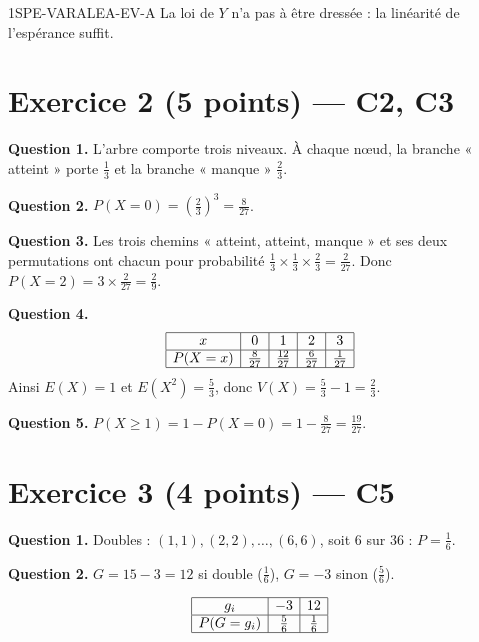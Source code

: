 \begin{corrige}{1SPE-VARALEA-EV-A}
La loi de $Y$ n'a pas à être dressée : la linéarité de l'espérance suffit.

\section*{Exercice 2 \hfill (5 points) — C2, C3}


\textbf{Question 1.} L'arbre comporte trois niveaux. À chaque nœud, la branche « atteint » porte $\frac13$ et la branche « manque » $\frac23$.

\medskip
\textbf{Question 2.} $P(X=0)=\left(\frac23\right)^3=\frac8{27}$.

\medskip
\textbf{Question 3.} Les trois chemins « atteint, atteint, manque » et ses deux permutations ont chacun pour probabilité $\frac13\times\frac13\times\frac23=\frac2{27}$. Donc $P(X=2)=3\times\frac2{27}=\frac29$.

\medskip
\textbf{Question 4.}
\[
\begin{array}{|c|c|c|c|c|}\hline
x&0&1&2&3\\ \hline
P(X=x)&\frac8{27}&\frac{12}{27}&\frac6{27}&\frac1{27}\\ \hline
\end{array}
\]
Ainsi $E(X)=1$ et $E(X^2)=\frac53$, donc $V(X)=\frac53-1=\frac23$.

\medskip
\textbf{Question 5.} $P(X\geq1)=1-P(X=0)=1-\frac8{27}=\frac{19}{27}$.

\section*{Exercice 3 \hfill (4 points) — C5}


\textbf{Question 1.} Doubles : $(1,1),(2,2),\ldots,(6,6)$, soit $6$ sur $36$ : $P = \frac{1}{6}$.

\medskip
\textbf{Question 2.} $G = 15 - 3 = 12$ si double ($\frac{1}{6}$), $G = -3$ sinon ($\frac{5}{6}$).

\[
\begin{array}{|c|c|c|}
\hline
g_i & -3 & 12 \\
\hline
P(G=g_i) & \frac{5}{6} & \frac{1}{6} \\
\hline
\end{array}
\]


\end{corrige}
